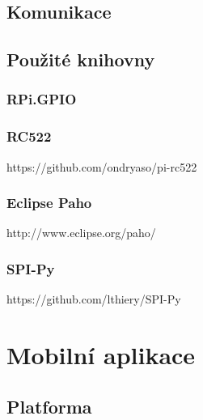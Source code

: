 \documentclass[czech,BP]{thesiskiv}
\begin{document}
	\section{Komunikace}
	
		
	
	
	\section{Použité knihovny}
		\subsection{RPi.GPIO}
		\label{subsec:prigpio}
		
		\subsection{RC522}
			https://github.com/ondryaso/pi-rc522
		\subsection{Eclipse Paho}
			http://www.eclipse.org/paho/
		\subsection{SPI-Py}
			https://github.com/lthiery/SPI-Py

\chapter{Mobilní aplikace}
	



	\section{Platforma}
	
	
	
\end{document}
